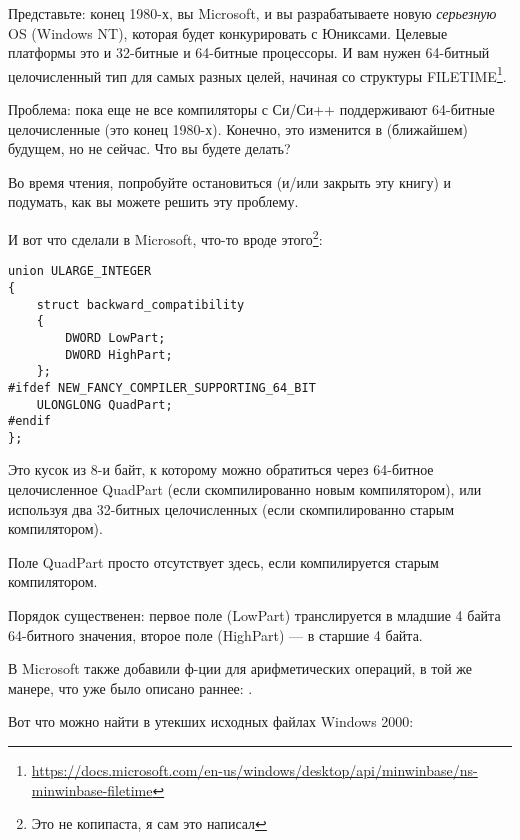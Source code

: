 \label{LargeInteger}

Представьте: конец 1980-х, вы Microsoft, и вы разрабатываете новую \emph{серьезную} \ac{OS} (Windows NT),
которая будет конкурировать с Юниксами.
Целевые платформы это и 32-битные и 64-битные процессоры.
И вам нужен 64-битный целочисленный тип для самых разных целей, начиная со структуры 
FILETIME\footnote{\url{https://docs.microsoft.com/en-us/windows/desktop/api/minwinbase/ns-minwinbase-filetime}}.

Проблема: пока еще не все компиляторы с Си/Си++ поддерживают 64-битные целочисленные (это конец 1980-х).
Конечно, это изменится в (ближайшем) будущем, но не сейчас.
Что вы будете делать?

Во время чтения, попробуйте остановиться (и/или закрыть эту книгу) и подумать, как вы можете решить эту проблему.

\clearpage

И вот что сделали в Microsoft, что-то вроде этого\footnote{Это не копипаста, я сам это написал}:

\begin{lstlisting}
union ULARGE_INTEGER
{
    struct backward_compatibility
    {
        DWORD LowPart;
        DWORD HighPart;
    };
#ifdef NEW_FANCY_COMPILER_SUPPORTING_64_BIT
    ULONGLONG QuadPart;
#endif
};
\end{lstlisting}

Это кусок из 8-и байт, к которому можно обратиться через 64-битное целочисленное QuadPart (если скомпилированно новым компилятором),
или используя два 32-битных целочисленных (если скомпилированно старым компилятором).

Поле QuadPart просто отсутствует здесь, если компилируется старым компилятором.

Порядок существенен: первое поле (LowPart) транслируется в младшие 4 байта 64-битного значения, второе поле (HighPart) ---
в старшие 4 байта.

В Microsoft также добавили ф-ции для арифметических операций, в той же манере, что уже было описано раннее:
.

Вот что можно найти в утекших исходных файлах Windows 2000:

